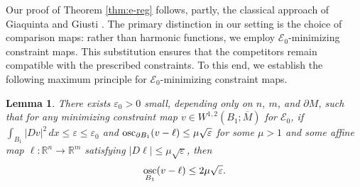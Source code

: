 \documentclass[11pt]{amsart}
\newcommand{\R}{{\mathbb R}}
\newcommand{\cE}{{\mathcal E}}
\newcommand{\e}{\varepsilon}
\newcommand{\osc}{\operatornamewithlimits{osc}}
\theoremstyle{plain}
\newtheorem{lem}[thm]{Lemma}
\theoremstyle{definition}
\theoremstyle{remark}
\numberwithin{equation}{section}
\begin{document}
Our proof of Theorem \ref{thm:e-reg} follows, partly,  the classical approach of Giaquinta and Giusti \cite{GG}. The primary distinction in our setting is the choice of comparison maps: rather than harmonic functions, we employ $\cE_0$-minimizing constraint maps. This substitution ensures that the competitors remain compatible with the prescribed constraints. To this end, we establish the following maximum principle for $\cE_0$-minimizing constraint maps.

\begin{lem}
    \label{lem:max}
    There exists $\e_0 > 0$ small, depending only on $n$, $m$, and $\partial M$, such that for any minimizing constraint map $v\in W^{1,2}(B_1;\overline M)$ for $\cE_0$, if $ \int_{B_1}|Dv|^2\,dx \leq \e \leq \e_0$ and $\osc_{\partial B_1}(v-\ell) \leq \mu\sqrt\e$ for some $\mu > 1$ and some affine map $\ell :\R^n\to\R^m$ satisfying $|D\ell|\leq \mu\sqrt\e$, then 
    \begin{equation}
        \label{eq:max}
        \osc_{B_1} (v - \ell)\leq 2 \mu \sqrt \e.
    \end{equation}
\end{lem}
\end{document}
